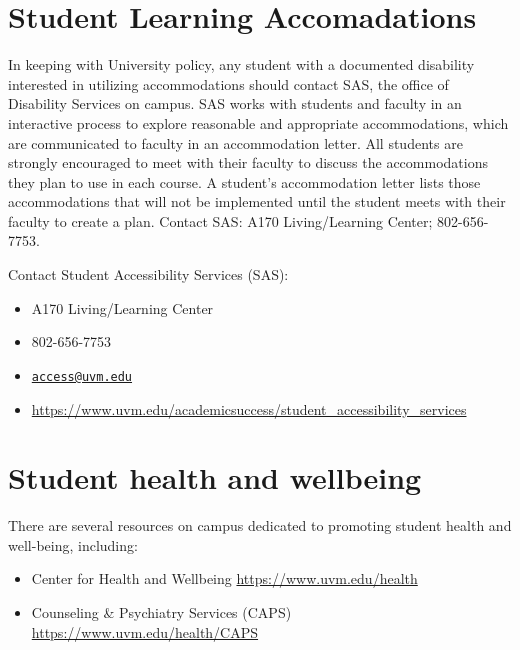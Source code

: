 \documentclass[12pt,]{article}
\providecommand{\tightlist}{%
  \setlength{\itemsep}{0pt}\setlength{\parskip}{0pt}}
\begin{document}
\section{Student Learning
Accomadations}\label{student-learning-accomadations}

In keeping with University policy, any student with a documented
disability interested in utilizing accommodations should contact SAS,
the office of Disability Services on campus. SAS works with students and
faculty in an interactive process to explore reasonable and appropriate
accommodations, which are communicated to faculty in an accommodation
letter. All students are strongly encouraged to meet with their faculty
to discuss the accommodations they plan to use in each course. A
student's accommodation letter lists those accommodations that will not
be implemented until the student meets with their faculty to create a
plan. Contact SAS: A170 Living/Learning Center; 802-656-7753.

Contact Student Accessibility Services (SAS):

\begin{itemize}
\tightlist
\item
  A170 Living/Learning Center
\item
  802-656-7753
\item
  \href{mailto:access@uvm.edu}{\nolinkurl{access@uvm.edu}}
\item
  \url{https://www.uvm.edu/academicsuccess/student_accessibility_services}
\end{itemize}

\section{Student health and
wellbeing}\label{student-health-and-wellbeing}

There are several resources on campus dedicated to promoting student
health and well-being, including:

\begin{itemize}
\item
  Center for Health and Wellbeing \url{https://www.uvm.edu/health}
\item
  Counseling \& Psychiatry Services (CAPS)
  \url{https://www.uvm.edu/health/CAPS}
\end{itemize}
\end{document}
